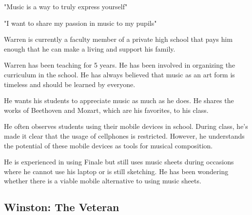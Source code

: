 "Music is a way to truly express yourself"

"I want to share my passion in music to my pupils"

Warren is currently a faculty member of a private high school that pays him enough that he can make a living and support his family.

Warren has been teaching for 5 years. He has been involved in organizing the curriculum in the school. He has always believed that music as an art form is timeless and should be learned by everyone.

He wants his students to appreciate music as much as he does. He shares the works of Beethoven and Mozart, which are his favorites, to his class.


He often observes students using their mobile devices in school. During class, he's made it clear that the usage of cellphones is restricted. However, he understands the potential of these mobile devices as tools for musical composition.


He is experienced in using Finale but still uses music sheets during occasions where he cannot use his laptop or is still sketching. He has been wondering whether there is a viable mobile alternative to using music sheets.



\begin{comment}
\begin{wrapfigure}{l}{0.5\textwidth}
  \begin{center}
    \texttt{[image: winston\_persona]}
  \end{center}
\end{wrapfigure}
\end{comment}

\subsection{Winston: The Veteran}

